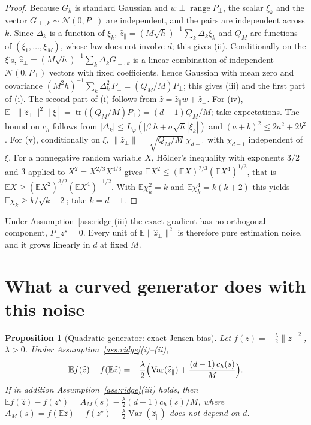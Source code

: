 \documentclass[11pt]{article}
\newtheorem{proposition}[lemma]{Proposition}
\theoremstyle{remark}
\theoremstyle{definition}
\newcommand{\E}{\mathbb E}
\newcommand{\norm}[1]{\lVert #1\rVert}
\newcommand{\zh}{\widehat z}
\newcommand{\zpar}{\widehat z_{\parallel}}
\newcommand{\zperp}{\widehat z_{\perp}}
\newcommand{\Pperp}{P_{\perp}}
\begin{document}
\begin{proof}
Because $G_k$ is standard Gaussian and $w\perp\operatorname{range}\Pperp$, the scalar
$\xi_k$ and the vector $G_{\perp,k}\sim\mathcal N(0,\Pperp)$ are independent, and the
pairs are independent across $k$. Since $\Delta_k$ is a function of $\xi_k$,
$\zpar=(M\sqrt h)^{-1}\sum_k\Delta_k\xi_k$ and $Q_M$ are functions of
$(\xi_1,\dots,\xi_M)$, whose law does not involve $d$; this gives (ii).
Conditionally on the $\xi$'s, $\zperp=(M\sqrt h)^{-1}\sum_k\Delta_k G_{\perp,k}$ is a
linear combination of independent $\mathcal N(0,\Pperp)$ vectors with fixed
coefficients, hence Gaussian with mean zero and covariance
$(M^2h)^{-1}\sum_k\Delta_k^2\,\Pperp=(Q_M/M)\Pperp$; this gives (iii) and the first part
of (i). The second part of (i) follows from $\zh=\zpar w+\zperp$.
For (iv), $\E[\norm{\zperp}^2\mid\xi]=\operatorname{tr}\bigl((Q_M/M)\Pperp\bigr)
=(d-1)Q_M/M$; take expectations. The bound on $c_h$ follows from
$|\Delta_k|\le L_\varphi(|\beta|h+\sigma\sqrt h|\xi_k|)$ and $(a+b)^2\le 2a^2+2b^2$.
For (v), conditionally on $\xi$, $\norm{\zperp}=\sqrt{Q_M/M}\;\chi_{d-1}$ with
$\chi_{d-1}$ independent of $\xi$. For a nonnegative random variable $X$, Hölder's
inequality with exponents $3/2$ and $3$ applied to $X^2=X^{2/3}X^{4/3}$ gives
$\E X^2\le(\E X)^{2/3}(\E X^4)^{1/3}$, that is
$\E X\ge(\E X^2)^{3/2}(\E X^4)^{-1/2}$. With $\E\chi_k^2=k$ and
$\E\chi_k^4=k(k+2)$ this yields $\E\chi_k\ge k/\sqrt{k+2}$; take $k=d-1$.
\end{proof}

Under Assumption~\ref{ass:ridge}(iii) the exact gradient has no orthogonal component,
$\Pperp z^\star=0$. Every unit of $\E\norm{\zperp}^2$ is therefore pure estimation noise,
and it grows linearly in $d$ at fixed $M$.

\section{What a curved generator does with this noise}

\begin{proposition}[Quadratic generator: exact Jensen bias]\label{prop:quad}
Let $f(z)=-\tfrac\lambda2\norm{z}^2$, $\lambda>0$. Under Assumption~\ref{ass:ridge}(i)--(ii),
\[
\E f(\zh)-f(\E\zh)=-\frac\lambda2\Bigl(\operatorname{Var}(\zpar)+\frac{(d-1)\,c_h(s)}{M}\Bigr).
\]
If in addition Assumption~\ref{ass:ridge}(iii) holds, then
$\E f(\zh)-f(z^\star)=A_M(s)-\tfrac\lambda2(d-1)c_h(s)/M$, where
$A_M(s)=f(\E\zh)-f(z^\star)-\tfrac\lambda2\operatorname{Var}(\zpar)$ does not depend on $d$.
\end{proposition}
\end{document}

